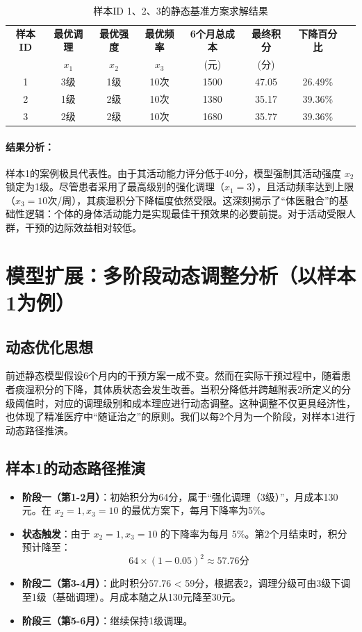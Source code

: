 \documentclass[12pt,a4paper]{article}
\begin{document}
\begin{table}[htbp]
\centering
\caption{样本ID 1、2、3的静态基准方案求解结果}
\label{tab:sample_results}
\begin{tabular}{cccccccc}
\toprule
\textbf{样本ID} & \textbf{最优调理} & \textbf{最优强度} & \textbf{最优频率} & \textbf{6个月总成本} & \textbf{最终积分} & \textbf{下降百分比} \\
& $x_1$ & $x_2$ & $x_3$ & (元) & (分) & \\
\midrule
1 & 3级 & 1级 & 10次 & 1500 & 47.05 & 26.49\% \\
2 & 1级 & 2级 & 10次 & 1380 & 35.17 & 39.36\% \\
3 & 2级 & 2级 & 10次 & 1680 & 35.77 & 39.36\% \\
\bottomrule
\end{tabular}
\end{table}

\paragraph{结果分析：}
    样本1的案例极具代表性。由于其活动能力评分低于40分，模型强制其活动强度 $x_2$ 锁定为1级。尽管患者采用了最高级别的强化调理（$x_1 = 3$），且活动频率达到上限（$x_3 = 10$次/周），其痰湿积分下降幅度依然受限。这深刻揭示了“体医融合”的基础性逻辑：个体的身体活动能力是实现最佳干预效果的必要前提。对于活动受限人群，干预的边际效益相对较低。

\section{模型扩展：多阶段动态调整分析（以样本1为例）}

\subsection{动态优化思想}
前述静态模型假设6个月内的干预方案一成不变。然而在实际干预过程中，随着患者痰湿积分的下降，其体质状态会发生改善。当积分降低并跨越附表2所定义的分级阈值时，对应的调理级别和成本理应进行动态调整。这种调整不仅更具经济性，也体现了精准医疗中“随证治之”的原则。我们以每2个月为一个阶段，对样本1进行动态路径推演。

\subsection{样本1的动态路径推演}
\begin{itemize}
    \item \textbf{阶段一（第1-2月）}：初始积分为64分，属于“强化调理（3级）”，月成本130元。在 $x_2=1, x_3=10$ 的最优方案下，每月下降率为5\%。
    \item \textbf{状态触发}：由于 $x_2=1, x_3=10$ 的下降率为每月 5\%。第2个月结束时，积分预计降至：
    \begin{equation}
    64 \times (1-0.05)^2 \approx 57.76 \text{分}
    \end{equation}
    \item \textbf{阶段二（第3-4月）}：此时积分57.76 < 59分，根据表2，调理分级可由3级下调至1级（基础调理）。月成本随之从130元降至30元。
    \item \textbf{阶段三（第5-6月）}：继续保持1级调理。
\end{itemize}
\end{document}

